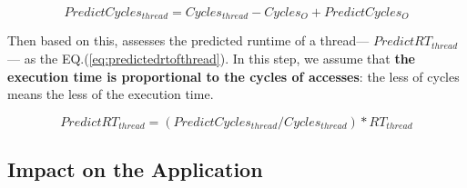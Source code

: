 \begin{equation}
\label{eq:predictedcyclesofthread}
 PredictCycles_{thread} = Cycles_{thread} - Cycles_{O} + PredictCycles_{O} 
\end{equation} 
 

Then based on this, \cheetah{} assesses the predicted runtime of a thread--- $PredictRT_{thread}$--- as the EQ.(\ref{eq:predictedrtofthread}). In this step, we assume that {\bf the execution time is proportional to the cycles of accesses}: the less of cycles means the less of the execution time.  

\begin{equation}
\label{eq:predictedrtofthread}
 PredictRT_{thread} = (PredictCycles_{thread}/Cycles_{thread}) * RT_{thread} 
\end{equation} 

\subsection{Impact on the Application}
\label{sec:impactapp}



